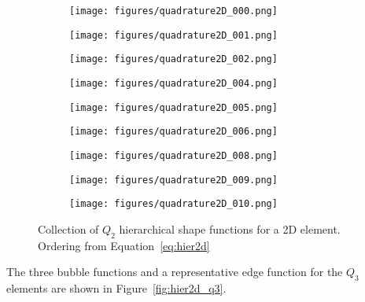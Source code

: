 \documentclass[11pt]{style/memo}
\begin{document}
\begin{figure}[h]
    \centering
    \begin{subfigure}[b]{0.3\textwidth}
        \centering
        \texttt{[image: figures/quadrature2D\_000.png]}
    \end{subfigure}
    \hfill
    \begin{subfigure}[b]{0.3\textwidth}
        \centering
        \texttt{[image: figures/quadrature2D\_001.png]}
    \end{subfigure}
    \hfill
    \begin{subfigure}[b]{0.3\textwidth}
        \centering
        \texttt{[image: figures/quadrature2D\_002.png]}
    \end{subfigure}

    \begin{subfigure}[b]{0.3\textwidth}
        \centering
        \texttt{[image: figures/quadrature2D\_004.png]}
    \end{subfigure}
    \hfill
    \begin{subfigure}[b]{0.3\textwidth}
        \centering
        \texttt{[image: figures/quadrature2D\_005.png]}
    \end{subfigure}
    \hfill
    \begin{subfigure}[b]{0.3\textwidth}
        \centering
        \texttt{[image: figures/quadrature2D\_006.png]}
    \end{subfigure}

    \begin{subfigure}[b]{0.3\textwidth}
        \centering
        \texttt{[image: figures/quadrature2D\_008.png]}
    \end{subfigure}
    \hfill
    \begin{subfigure}[b]{0.3\textwidth}
        \centering
        \texttt{[image: figures/quadrature2D\_009.png]}
    \end{subfigure}
    \hfill
    \begin{subfigure}[b]{0.3\textwidth}
        \centering
        \texttt{[image: figures/quadrature2D\_010.png]}
    \end{subfigure}
    \caption{Collection of $Q_2$ hierarchical shape functions for a 2D element. Ordering from Equation~\ref{eq:hier2d}}
    \label{fig:hier2d}
\end{figure}

The three bubble functions and a representative edge function for the $Q_3$ elements
are shown in Figure~\ref{fig:hier2d_q3}.
\end{document}
